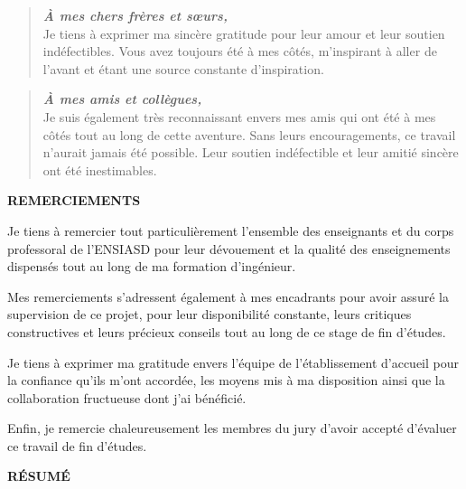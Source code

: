 \documentclass[12pt, a4paper, oneside]{report}
\begin{document}
\vspace{1cm}
\begin{quote}
\textit{\large \textbf{À mes chers frères et sœurs,}}\\
Je tiens à exprimer ma sincère gratitude pour leur amour et leur soutien indéfectibles. Vous avez toujours été à mes côtés, m'inspirant à aller de l'avant et étant une source constante d'inspiration.
\end{quote}

\vspace{1cm}
\begin{quote}
\textit{\large \textbf{À mes amis et collègues,}}\\
Je suis également très reconnaissant envers mes amis qui ont été à mes côtés tout au long de cette aventure. Sans leurs encouragements, ce travail n'aurait jamais été possible. Leur soutien indéfectible et leur amitié sincère ont été inestimables.
\end{quote}

\newpage

\vspace*{1cm}
\begin{center}
  {\Huge \textbf{REMERCIEMENTS}}
\end{center}
\vspace{1cm}

Je tiens à remercier tout particulièrement l'ensemble des enseignants et du corps professoral de l'ENSIASD pour leur dévouement et la qualité des enseignements dispensés tout au long de ma formation d'ingénieur.

Mes remerciements s'adressent également à mes encadrants pour avoir assuré la supervision de ce projet, pour leur disponibilité constante, leurs critiques constructives et leurs précieux conseils tout au long de ce stage de fin d'études.

Je tiens à exprimer ma gratitude envers l'équipe de l'établissement d'accueil pour la confiance qu'ils m'ont accordée, les moyens mis à ma disposition ainsi que la collaboration fructueuse dont j'ai bénéficié.

Enfin, je remercie chaleureusement les membres du jury d'avoir accepté d'évaluer ce travail de fin d'études.

\newpage

\vspace*{0.5cm}
\begin{center}
  {\Huge \textbf{RÉSUMÉ}}
\end{center}
\vspace{0.8cm}
\end{document}
